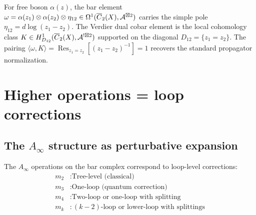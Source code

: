 \begin{example}
For free boson $\alpha(z)$, the bar element
$\omega = \alpha(z_1) \otimes \alpha(z_2) \otimes \eta_{12}
\in \Omega^1(\overline{C}_2(X), \mathcal{A}^{\boxtimes 2})$
carries the simple pole $\eta_{12} = d\log(z_1-z_2)$.  The Verdier dual
cobar element is the local cohomology class
$K \in H^1_{D_{12}}(\overline{C}_2(X), \mathcal{A}^{!\boxtimes 2})$
supported on the diagonal $D_{12} = \{z_1 = z_2\}$.  The pairing
$\langle \omega, K \rangle
= \operatorname{Res}_{z_1 = z_2}[(z_1 - z_2)^{-1}] = 1$
recovers the standard propagator normalization.
\end{example}

\section{Higher operations = loop corrections}

\subsection{\texorpdfstring{The $A_\infty$ structure as perturbative expansion}{The A infty structure as perturbative expansion}}

\begin{conjecture}[Loop expansion = \texorpdfstring{$A_\infty$}{A-infinity} operations; \ClaimStatusHeuristic]
\label{conj:loop-expansion-ainfty}
The $A_\infty$ operations on the bar complex correspond to loop-level corrections:
\begin{align*}
m_2 &: \text{Tree-level (classical)} \\
m_3 &: \text{One-loop (quantum correction)} \\
m_4 &: \text{Two-loop or one-loop with splitting} \\
m_k &: \text{$(k-2)$-loop or lower-loop with splittings}
\end{align*}
\end{conjecture}

